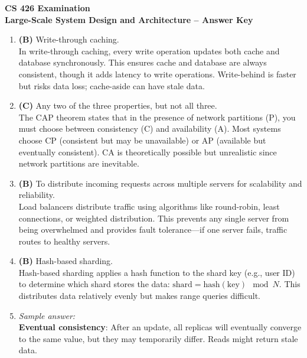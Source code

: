 \documentclass[11pt]{article}
\begin{document}
\begin{center}
  {\Large \textbf{CS 426 Examination}}\\[0.25em]
  {\large \textbf{Large-Scale System Design and Architecture -- Answer Key}}\\[0.5em]
\end{center}

\begin{enumerate}[label=\textbf{\arabic*.}]

  \item \textbf{(B)} Write-through caching.\\
  In write-through caching, every write operation updates both cache and database synchronously. 
  This ensures cache and database are always consistent, though it adds latency to write operations. 
  Write-behind is faster but risks data loss; cache-aside can have stale data.

  \item \textbf{(C)} Any two of the three properties, but not all three.\\
  The CAP theorem states that in the presence of network partitions (P), you must choose between 
  consistency (C) and availability (A). Most systems choose CP (consistent but may be unavailable) 
  or AP (available but eventually consistent). CA is theoretically possible but unrealistic since 
  network partitions are inevitable.

  \item \textbf{(B)} To distribute incoming requests across multiple servers for scalability and 
  reliability.\\
  Load balancers distribute traffic using algorithms like round-robin, least connections, or 
  weighted distribution. This prevents any single server from being overwhelmed and provides 
  fault tolerance—if one server fails, traffic routes to healthy servers.

  \item \textbf{(B)} Hash-based sharding.\\
  Hash-based sharding applies a hash function to the shard key (e.g., user ID) to determine which 
  shard stores the data: $\text{shard} = \text{hash}(\text{key}) \mod N$. This distributes data 
  relatively evenly but makes range queries difficult.

  \item \emph{Sample answer:}\\
  \textbf{Eventual consistency}: After an update, all replicas will eventually converge to the 
  same value, but they may temporarily differ. Reads might return stale data.


\end{enumerate}
\end{document}
